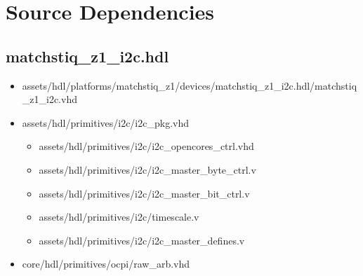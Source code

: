 \documentclass{article}
\def\comp{matchstiq\_z1\_i2c}
\begin{document}
\section*{Source Dependencies}
\subsection*{\comp.hdl}
\begin{itemize}
	\item assets/hdl/platforms/matchstiq\_z1/devices/\comp.hdl/\comp.vhd
	\item assets/hdl/primitives/i2c/i2c\_pkg.vhd
	      \begin{itemize}
	      	\item assets/hdl/primitives/i2c/i2c\_opencores\_ctrl.vhd
	      	\item assets/hdl/primitives/i2c/i2c\_master\_byte\_ctrl.v
	      	\item assets/hdl/primitives/i2c/i2c\_master\_bit\_ctrl.v
	      	\item assets/hdl/primitives/i2c/timescale.v
	      	\item assets/hdl/primitives/i2c/i2c\_master\_defines.v
	      \end{itemize}
	\item core/hdl/primitives/ocpi/raw\_arb.vhd
\end{itemize}
\end{document}
